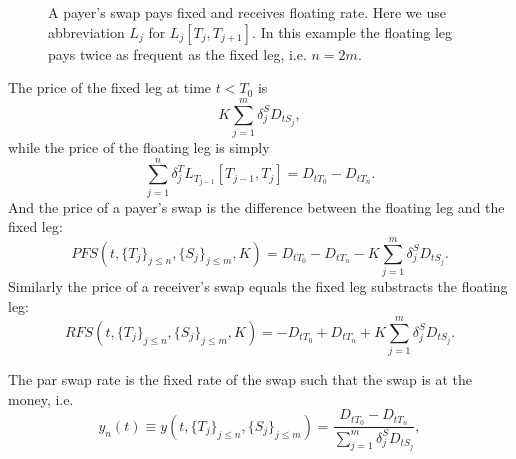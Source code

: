 \begin{figure}
  \caption{A payer's swap pays fixed and receives floating rate. Here we use
           abbreviation $L_j$ for $L_j[T_j,T_{j+1}]$. In this example the
           floating leg pays twice as frequent as the fixed leg, i.e. $n=2m$.}
  \label{F:swap}
\end{figure}

The price of the fixed leg at time $t<T_0$ is
\[
  K \sum_{j=1}^m \delta^S_j D_{tS_j},
\]
while the price of the floating leg is simply
\[
  \sum_{j=1}^n \delta^T_j L_{T_{j-1}}[T_{j-1},T_j]
    = D_{tT_0} - D_{tT_n}.
\]
And the price of a payer's swap is the difference between the floating leg and
the fixed leg:
\begin{equation}
  PFS(t,\{T_j\}_{j\le n},\{S_j\}_{j\le m},K)
    = D_{tT_0} - D_{tT_n} - K\sum_{j=1}^m \delta^S_j D_{tS_j}.
\end{equation}
Similarly the price of a receiver's swap equals the fixed leg substracts the
floating leg:
\begin{equation}
  RFS(t,\{T_j\}_{j\le n},\{S_j\}_{j\le m},K)
    = -D_{tT_0} + D_{tT_n} + K\sum_{j=1}^m \delta^S_j D_{tS_j}.
\end{equation}


The par swap rate is the fixed rate of the swap such that the swap is at the 
money, i.e.
\begin{equation} \label{E:swap}
  y_n(t) \equiv y(t,\{T_j\}_{j\le n},\{S_j\}_{j\le m}) 
    = \frac{ D_{tT_0} - D_{tT_n} }{ \sum_{j=1}^m \delta^S_j D_{tS_j} },
\end{equation}


